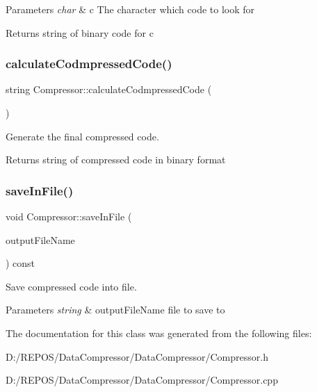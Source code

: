 \begin{DoxyParams}{Parameters}
{\em char} & c The character which code to look for \\
\hline
\end{DoxyParams}
\begin{DoxyReturn}{Returns}
string of binary code for c 
\end{DoxyReturn}
\mbox{\label{class_compressor_a1973489d6ff8cff1458e9eff8dd0e556}} 
\subsubsection{\texorpdfstring{calculateCodmpressedCode()}{calculateCodmpressedCode()}}
{\footnotesize\ttfamily string Compressor\+::calculate\+Codmpressed\+Code (\begin{DoxyParamCaption}{ }\end{DoxyParamCaption})}



Generate the final compressed code. 

\begin{DoxyReturn}{Returns}
string of compressed code in binary format 
\end{DoxyReturn}
\mbox{\label{class_compressor_a462c120db290b92e49a566ada6ba6edf}} 
\subsubsection{\texorpdfstring{saveInFile()}{saveInFile()}}
{\footnotesize\ttfamily void Compressor\+::save\+In\+File (\begin{DoxyParamCaption}\item[{string}]{output\+File\+Name }\end{DoxyParamCaption}) const}



Save compressed code into file. 


\begin{DoxyParams}{Parameters}
{\em string} & output\+File\+Name file to save to \\
\hline
\end{DoxyParams}


The documentation for this class was generated from the following files\+:\begin{DoxyCompactItemize}
\item 
D\+:/\+R\+E\+P\+O\+S/\+Data\+Compressor/\+Data\+Compressor/Compressor.\+h\item 
D\+:/\+R\+E\+P\+O\+S/\+Data\+Compressor/\+Data\+Compressor/Compressor.\+cpp\end{DoxyCompactItemize}
